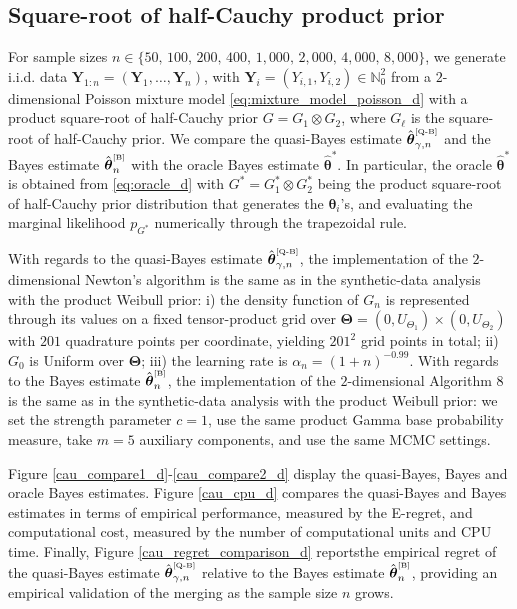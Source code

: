\documentclass[twoside,12pt]{article}
\begin{document}
\subsection{Square-root of half-Cauchy product prior}


For sample sizes $n\in\{50,\,100,\,200,\,400,\,1,000,\,2,000,\,4,000,\,8,000\}$, we generate i.i.d. data $\boldsymbol Y_{1:n}=(\boldsymbol Y_1,\ldots,\boldsymbol Y_n)$, with $\boldsymbol Y_i=(Y_{i,1},Y_{i,2})\in\mathbb N_0^2$ from a $2$-dimensional Poisson mixture model \eqref{eq:mixture_model_poisson_d} with a product square-root of half-Cauchy prior $G=G_1\otimes G_2$, where $G_{\ell}$ is the square-root of half-Cauchy prior. We compare the quasi-Bayes estimate $\hat{\boldsymbol{\theta}}^{\text{\tiny{[Q-B]}}}_{\gamma,n}$ and the Bayes estimate $\hat{\boldsymbol{\theta}}^{\text{\tiny{[B]}}}_{n}$ with the oracle Bayes estimate $\hat{\boldsymbol{\theta}}^{\ast}$. In particular, the oracle $\hat{\boldsymbol{\theta}}^{\ast}$ is obtained from \eqref{eq:oracle_d} with $G^{\ast}=G_1^{\ast}\otimes G_2^{\ast}$ being the product square-root of half-Cauchy prior distribution that generates the $\boldsymbol{\theta}_{i}$'s, and evaluating the marginal likelihood $p_{G^\ast}$ numerically through the trapezoidal rule.
 
With regards to the quasi-Bayes estimate $\hat{\boldsymbol\theta}^{\text{\tiny{[Q-B]}}}_{\gamma,n}$, the implementation of the $2$-dimensional Newton's algorithm is the same as in the synthetic-data analysis with the product Weibull prior: i) the density function of $G_n$ is represented through its values on a fixed tensor-product grid over $\boldsymbol{\Theta}=(0,U_{\Theta_{1}})\times(0,U_{\Theta_{2}})$ with $201$ quadrature points per coordinate, yielding $201^2$ grid points in total; ii) $G_0$ is Uniform over $\boldsymbol{\Theta}$; iii) the learning rate is $\alpha_{n}=(1+n)^{-0.99}$. With regards to the Bayes estimate  $\hat{\boldsymbol{\theta}}^{\text{\tiny{[B]}}}_{n}$, the implementation of the $2$-dimensional Algorithm 8 is the same as in the synthetic-data analysis with the product Weibull prior: we set the strength parameter $c=1$, use the same product Gamma base probability measure, take $m=5$ auxiliary components, and use the same MCMC settings.

Figure \ref{cau_compare1_d}-\ref{cau_compare2_d} display the quasi-Bayes, Bayes and oracle Bayes estimates. Figure \ref{cau_cpu_d} compares the quasi-Bayes and Bayes estimates in terms of empirical performance, measured by the E-regret, and computational cost, measured by the number of computational units and CPU time. Finally, Figure \ref{cau_regret_comparison_d} reportsthe empirical regret of the quasi-Bayes estimate $\hat{\boldsymbol{\theta}}^{\text{\tiny{[Q-B]}}}_{\gamma,n}$ relative to the Bayes estimate $\hat{\boldsymbol{\theta}}^{\text{\tiny{[B]}}}_{n}$, providing an empirical validation of the merging as the sample size $n$ grows.
\end{document}
